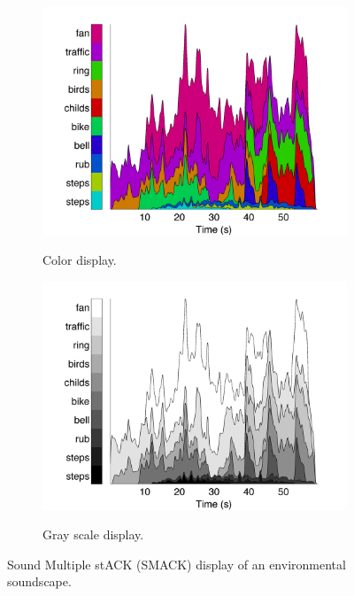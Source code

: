 \documentclass{article}
\begin{document}
\begin{figure}[!h]
 \centering
\begin{subfigure}[b]{.5\textwidth}
\caption{Color display.}
\includegraphics[width=\textwidth]{Multisource_smack}
\label{fig:smack_color}
\end{subfigure}
\begin{subfigure}[b]{.5\textwidth}
\caption{Gray scale display.}
\includegraphics[width=\textwidth]{Multisource_smack_gray}
\label{fig:smack_gray}
\end{subfigure}
 \vspace{-20pt}
\caption{Sound Multiple stACK (SMACK) display of an environmental soundscape.}
\label{fig:smack}
 \vspace{-20pt}
\end{figure}
\end{document}
